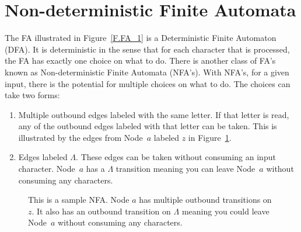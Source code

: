 \documentclass[letterpaper,12pt,openany,reqno]{book}%
\newcommand{\faterminalnode}[3] {\node at (#1) (#2) [circle, draw, double, minimum size=24pt] {#2};}
\newcommand{\fastart}[1] {\coordinate (start) at (#1);}
\newcommand{\fanonterminalnode}[2] {\node at (#1) (#2) [circle, draw, minimum size=24pt] {#2};}
\newcommand{\fatransition}[3] {\draw [->] (#1) -- (#2) node [midway, above] {#3};}
\newcommand{\farighttransition}[3] {\draw [->] (#1) -- (#2) node [midway, right] {#3};}
\begin{document}
\section{Non-deterministic Finite Automata}

The FA illustrated in Figure~\ref{F.FA_1} is a Deterministic Finite Automaton (DFA). It is deterministic in the sense that for each character that is processed, the FA has exactly one choice on what to do. There is another class of FA's known as Non-deterministic Finite Automata (NFA's). With NFA's, for a given input, there is the potential for multiple choices on what to do. The choices can take two forms:
\begin{enumerate}
\item Multiple outbound edges labeled with the same letter. If that letter is read, any of the outbound edges labeled with that letter can be taken. This is illustrated by the edges from Node~$a$ labeled $z$ in Figure~\ref{F.NFA_1}.
\item Edges labeled $\Lambda$. These edges can be taken without consuming an input character. Node~$a$ has a $\Lambda$ transition meaning you can leave Node~$a$ without consuming any characters.
\end{enumerate}

\begin{figure}[hbt]
\centering
{}
 \caption[Sample Non-deterministic Finite Automaton]{This is a sample NFA. Node $a$ has multiple outbound transitions on $z$. It also has an outbound transition on $\Lambda$ meaning you could leave Node~$a$ without consuming any characters.}
  \label{F.NFA_1}
\end{figure}
\end{document}
